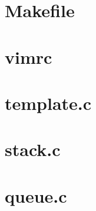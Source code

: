 \documentclass[letterpaper,landscape]{article}
\begin{document}
\begin{multicols}{3}
    \tableofcontents
\end{multicols}
\clearpage

\section{Makefile}
\begin{multicols}{3}
    

    \section{vimrc}
    

    \section{template.c}
    

    \section{stack.c}
    

    \section{queue.c}
    

    \clearpage
\end{multicols}
\printindex
\end{document}
